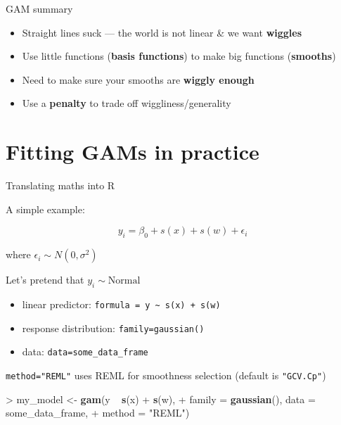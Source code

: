 \documentclass[10pt,ignorenonframetext,compress, aspectratio=169]{beamer}
\newenvironment{Shaded}{\begin{snugshade}}{\end{snugshade}}
\newcommand{\KeywordTok}[1]{\textcolor[rgb]{0.13,0.29,0.53}{\textbf{{#1}}}}
\newcommand{\DataTypeTok}[1]{\textcolor[rgb]{0.13,0.29,0.53}{{#1}}}
\newcommand{\StringTok}[1]{\textcolor[rgb]{0.31,0.60,0.02}{{#1}}}
\newcommand{\NormalTok}[1]{{#1}}
\providecommand{\tightlist}{%
  \setlength{\itemsep}{0pt}\setlength{\parskip}{0pt}}
\begin{document}
\begin{frame}{GAM summary}

\begin{itemize}
\tightlist
\item
  Straight lines suck --- the world is not linear \& we want
  \textbf{wiggles}
\item
  Use little functions (\textbf{basis functions}) to make big functions
  (\textbf{smooths})
\item
  Need to make sure your smooths are \textbf{wiggly enough}
\item
  Use a \textbf{penalty} to trade off wiggliness/generality
\end{itemize}

\end{frame}

\section{Fitting GAMs in practice}\label{fitting-gams-in-practice}

\begin{frame}[fragile]{Translating maths into R}

A simple example:

\[
y_i = \beta_0 + s(x) + s(w) + \epsilon_i
\]

where \(\epsilon_i \sim N(0, \sigma^2)\)

Let's pretend that \(y_i \sim \text{Normal}\)

\begin{itemize}
\tightlist
\item
  linear predictor:
  \texttt{formula\ =\ y\ \textasciitilde{}\ s(x)\ +\ s(w)}
\item
  response distribution: \texttt{family=gaussian()}
\item
  data: \texttt{data=some\_data\_frame}
\end{itemize}

\texttt{method="REML"} uses REML for smoothness selection (default is
\texttt{"GCV.Cp"})

\begin{Shaded}
\begin{Highlighting}[]
\NormalTok{>}\StringTok{ }\NormalTok{my_model <-}\StringTok{ }\KeywordTok{gam}\NormalTok{(y ~}\StringTok{ }\KeywordTok{s}\NormalTok{(x) +}\StringTok{ }\KeywordTok{s}\NormalTok{(w),}
\NormalTok{+}\StringTok{                 }\DataTypeTok{family =} \KeywordTok{gaussian}\NormalTok{(), }\DataTypeTok{data =} \NormalTok{some_data_frame,}
\NormalTok{+}\StringTok{                 }\DataTypeTok{method =} \StringTok{"REML"}\NormalTok{)}
\end{Highlighting}
\end{Shaded}

\end{frame}
\end{document}

